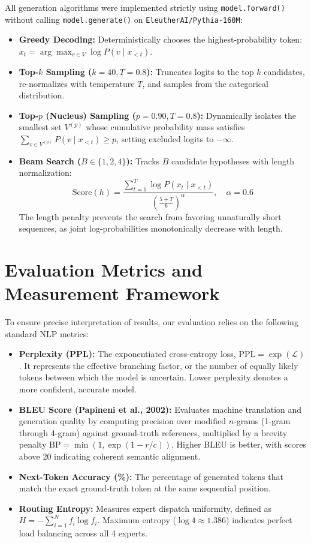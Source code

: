 \documentclass[11pt,a4paper]{article}
\begin{document}
All generation algorithms were implemented strictly using \texttt{model.forward()} without calling \texttt{model.generate()} on \texttt{EleutherAI/Pythia-160M}:
\begin{itemize}
    \item \textbf{Greedy Decoding:} Deterministically chooses the highest-probability token: $x_t = \arg\max_{v \in V} \log P(v \mid x_{<t})$.
    \item \textbf{Top-$k$ Sampling ($k=40, T=0.8$):} Truncates logits to the top $k$ candidates, re-normalizes with temperature $T$, and samples from the categorical distribution.
    \item \textbf{Top-$p$ (Nucleus) Sampling ($p=0.90, T=0.8$):} Dynamically isolates the smallest set $V^{(p)}$ whose cumulative probability mass satisfies $\sum_{v \in V^{(p)}} P(v \mid x_{<t}) \ge p$, setting excluded logits to $-\infty$.
    \item \textbf{Beam Search ($B \in \{1, 2, 4\}$):} Tracks $B$ candidate hypotheses with length normalization:
    \begin{equation}
    \text{Score}(h) = \frac{\sum_{t=1}^T \log P(x_t \mid x_{<t})}{\left(\frac{5+T}{6}\right)^\alpha}, \quad \alpha = 0.6
    \end{equation}
    The length penalty prevents the search from favoring unnaturally short sequences, as joint log-probabilities monotonically decrease with length.
\end{itemize}

\section{Evaluation Metrics and Measurement Framework}

To ensure precise interpretation of results, our evaluation relies on the following standard NLP metrics:
\begin{itemize}
    \item \textbf{Perplexity (PPL):} The exponentiated cross-entropy loss, $\text{PPL} = \exp(\mathcal{L})$. It represents the effective branching factor, or the number of equally likely tokens between which the model is uncertain. Lower perplexity denotes a more confident, accurate model.
    \item \textbf{BLEU Score (Papineni et al., 2002):} Evaluates machine translation and generation quality by computing precision over modified $n$-grams (1-gram through 4-gram) against ground-truth references, multiplied by a brevity penalty $\text{BP} = \min(1, \exp(1 - r/c))$. Higher BLEU is better, with scores above 20 indicating coherent semantic alignment.
    \item \textbf{Next-Token Accuracy (\%):} The percentage of generated tokens that match the exact ground-truth token at the same sequential position.
    \item \textbf{Routing Entropy:} Measures expert dispatch uniformity, defined as $H = -\sum_{i=1}^N f_i \log f_i$. Maximum entropy ($\log 4 \approx 1.386$) indicates perfect load balancing across all 4 experts.
\end{itemize}
\end{document}
